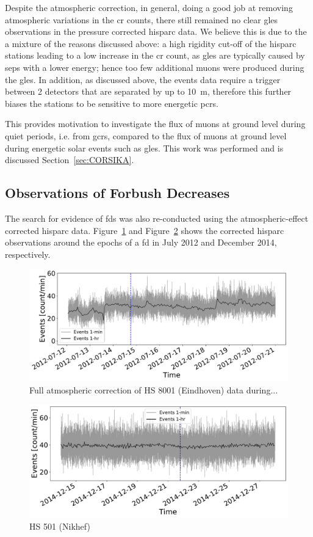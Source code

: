 Despite the atmospheric correction, in general, doing a good job at removing atmospheric variations in the \gls{cr} counts, there still remained no clear \glspl{gle} observations in the pressure corrected \gls{hisparc} data. We believe this is due to the a mixture of the reasons discussed above: a high rigidity cut-off of the \gls{hisparc} stations leading to a low increase in the \gls{cr} count, as \glspl{gle} are typically caused by \glspl{sep} with a lower energy; hence too few additional muons were produced during the \glspl{gle}. In addition, as discussed above, the events data require a trigger between 2 detectors that are separated by up to 10~m, therefore this further biases the stations to be sensitive to more energetic \glspl{pcr}. 

This provides motivation to investigate the flux of muons at ground level during quiet periods, i.e. from \glspl{gcr}, compared to the flux of muons at ground level during energetic solar events such as \glspl{gle}. This work was performed and is discussed Section~\ref{sec:CORSIKA}.


\subsection{Observations of Forbush Decreases}

The search for evidence of \glspl{fd} was also re-conducted using the atmospheric-effect corrected \gls{hisparc} data. Figure~\ref{fig:FD_201207_8001_Pcorr} and Figure~\ref{fig:FD_201412_501_Pcorr} shows the corrected \gls{hisparc} observations around the epochs of a \gls{fd} in July 2012 and December 2014, respectively.

\begin{figure}[ht]
	\centering
	\includegraphics[width=0.65\columnwidth]{FD_201207_8001_CORR.pdf}
	\caption{Full atmospheric correction of HS 8001 (Eindhoven) data during...}
	\label{fig:FD_201207_8001_Pcorr}
\end{figure}

\begin{figure}[ht]
	\centering
	\includegraphics[width=0.65\columnwidth]{FD_201412_501_CORR.pdf}
	\caption{HS 501 (Nikhef)}
	\label{fig:FD_201412_501_Pcorr}
\end{figure}


